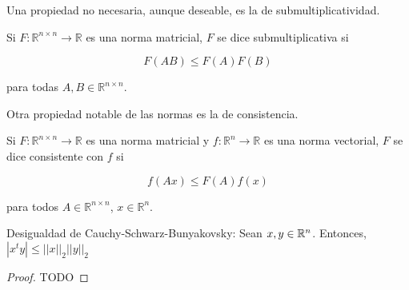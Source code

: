 Una propiedad no necesaria, aunque deseable, es la de submultiplicatividad.

\begin{defi}
Si $F : \mathbb{R}^{n \times n} \to \mathbb{R}$ es una norma matricial, $F$ se dice submultiplicativa si

\[F(AB) \leq F(A)F(B)\]

para todas $A, B \in \mathbb{R}^{n \times n}$.
\end{defi}

Otra propiedad notable de las normas es la de consistencia.

\begin{defi}
Si $F : \mathbb{R}^{n \times n} \to \mathbb{R}$ es una norma matricial y $f : \mathbb{R}^n \to \mathbb{R}$ es una norma vectorial, $F$ se dice consistente con $f$ si

\[f(Ax) \leq F(A)f(x)\]

para todos $A \in \mathbb{R}^{n \times n}$, $x \in \mathbb{R}^n$.
\end{defi}

\begin{propi} Desigualdad de Cauchy-Schwarz-Bunyakovsky: Sean $x,y \in \mathbb{R}^{n}$.
    Entonces, $|x^ty| \leq ||x||_2 ||y||_2$

    \begin{proof}
        TODO
    \end{proof}
\end{propi}

